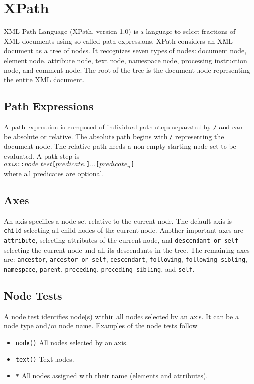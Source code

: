 \section{XPath}
XML Path Language (XPath, version 1.0) \cite{xpath} is a language to select fractions of XML documents using so-called path expressions. XPath considers an XML document as a tree of nodes. It recognizes seven types of nodes: document node, element node, attribute node, text node, namespace node, processing instruction node, and comment node. The root of the tree is the document node representing the entire XML document.

\subsection{Path Expressions}
A path expression is composed of individual path steps separated by \texttt{/} and can be absolute or relative. The absolute path begins with \texttt{/} representing the document node. The relative path needs a non-empty starting node-set to be evaluated. A path step is \\ \texttt{$axis$::$node\_test$[$predicate_1$]$\dots$[$predicate_n$]} \\
where all predicates are optional.

\subsection{Axes}
An axis specifies a node-set relative to the current node. The default axis is \texttt{child} selecting all child nodes of the current node. Another important axes are \texttt{attribute}, selecting attributes of the current node, and \texttt{descendant-or-self} selecting the current node and all its descendants in the tree. The remaining axes are: \texttt{ancestor}, \texttt{ancestor-or-self}, \texttt{descendant}, \texttt{following}, \texttt{following-sibling}, \texttt{namespace}, \texttt{parent}, \texttt{preceding}, \texttt{preceding-sibling}, and \texttt{self}.

\subsection{Node Tests}
A node test identifies node(s) within all nodes selected by an axis. It can be a node type and/or node name. Examples of the node tests follow.
\begin{itemize}
\item \texttt{node()} All nodes selected by an axis.
\item \texttt{text()} Text nodes.
\item \texttt{*} All nodes assigned with their name (elements and attributes).
\end{itemize}

